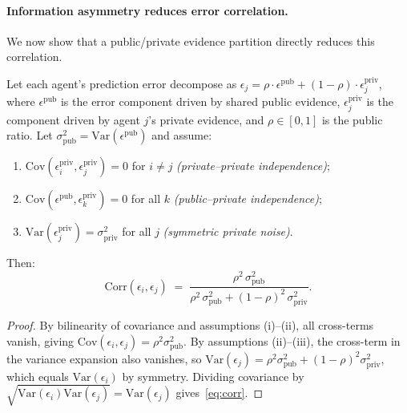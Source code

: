 \paragraph{Information asymmetry reduces error correlation.}
We now show that a public/private evidence partition directly reduces this correlation.

\begin{proposition}
    \label{prop:decorrelation}
    Let each agent's prediction error decompose as
    $\epsilon_j = \rho \cdot \epsilon^{\mathrm{pub}} + (1-\rho) \cdot \epsilon_j^{\mathrm{priv}}$,
    where $\epsilon^{\mathrm{pub}}$ is the error component driven by shared public evidence,
    $\epsilon_j^{\mathrm{priv}}$ is the component driven by agent $j$'s private evidence,
    and $\rho \in [0,1]$ is the public ratio.
    Let $\sigma_{\mathrm{pub}}^2 = \mathrm{Var}(\epsilon^{\mathrm{pub}})$ and assume:
    \begin{enumerate}[label=(\roman*),nosep,leftmargin=20pt,topsep=2pt,itemsep=1pt]
    \item $\mathrm{Cov}(\epsilon_i^{\mathrm{priv}}, \epsilon_j^{\mathrm{priv}}) = 0$ for $i \neq j$ \textit{(private--private independence)};
    \item $\mathrm{Cov}(\epsilon^{\mathrm{pub}}, \epsilon_k^{\mathrm{priv}}) = 0$ for all $k$ \textit{(public--private independence)};
    \item $\mathrm{Var}(\epsilon_j^{\mathrm{priv}}) = \sigma_{\mathrm{priv}}^2$ for all $j$ \textit{(symmetric private noise)}.
  \end{enumerate}
    Then:
    \begin{equation}
      \mathrm{Corr}(\epsilon_i, \epsilon_j) \;=\;
      \frac{\rho^2\,\sigma_{\mathrm{pub}}^2}
           {\rho^2\,\sigma_{\mathrm{pub}}^2 + (1{-}\rho)^2\,\sigma_{\mathrm{priv}}^2}.
      \label{eq:corr}
    \end{equation}
  \end{proposition}

\begin{proof}
  By bilinearity of covariance and assumptions (i)--(ii), all cross-terms vanish,
  giving $\mathrm{Cov}(\epsilon_i, \epsilon_j) = \rho^2\sigma_{\mathrm{pub}}^2$.
  By assumptions (ii)--(iii), the cross-term in the variance expansion also vanishes,
  so $\mathrm{Var}(\epsilon_j) = \rho^2\sigma_{\mathrm{pub}}^2 + (1{-}\rho)^2\sigma_{\mathrm{priv}}^2$,
  which equals $\mathrm{Var}(\epsilon_i)$ by symmetry.
  Dividing covariance by $\sqrt{\mathrm{Var}(\epsilon_i)\mathrm{Var}(\epsilon_j)} = \mathrm{Var}(\epsilon_j)$
  gives~\eqref{eq:corr}.
\end{proof}

